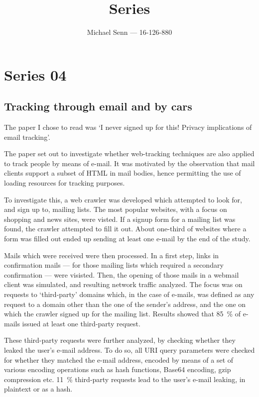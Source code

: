 \documentclass[a4paper]{scrreprt}
\title{Series \series}
\author{Michael Senn \maillink{michael.senn@students.unibe.ch} --- 16-126-880}
\date{\printdate}
\newcommand{\series}{04}
\begin{document}
\maketitle


\setcounter{chapter}{\numexpr \series - 1 \relax}

\chapter{Series \series}

\section{Tracking through email and by cars}

The paper I chose to read was `I never signed up for this! Privacy implications
of email tracking'\autocite{englehardtNeverSignedThis2018}.

The paper set out to investigate whether web-tracking techniques are also
applied to track people by means of e-mail. It was motivated by the observation
that mail clients support a subset of HTML in mail bodies, hence permitting
the use of loading resources for tracking purposes.

To investigate this, a web crawler was developed which attempted to look for,
and sign up to, mailing lists. The most popular websites, with a focus on
shopping and news sites, were visted. If a signup form for a mailing list was
found, the crawler attempted to fill it out. About one-third of websites where
a form was filled out ended up sending at least one e-mail by the end of the
study.

Mails which were received were then processed. In a first step, links in
confirmation mails --- for those mailing lists which required a secondary
confirmation --- were visisted. Then, the opening of those mails in a webmail
client was simulated, and resulting network traffic analyzed. The focus was on
requests to `third-party' domains which, in the case of e-mails, was defined as
any request to a domain other than the one of the sender's address, and the one
on which the crawler signed up for the mailing list. Results showed that 
\SI{85}{\percent} of e-mails issued at least one third-party request.

These third-party requests were further analyzed, by checking whether they
leaked the user's e-mail address. To do so, all URI query parameters were
checked for whether they matched the e-mail address, encoded by means of a set
of various encoding operations such as hash functions, Base64 encoding, gzip
compression etc. \SI{11}{\percent} third-party requests lead to the user's
e-mail leaking, in plaintext or as a hash.
\end{document}
